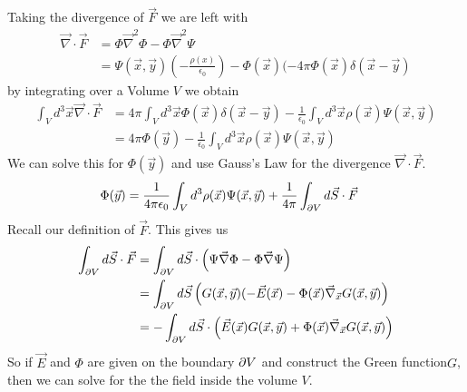 Taking the divergence of $\vec{F}$ we are left with
\begin{align*}
  \vec{\nabla}\cdot \vec{F} &= \Phi \vec{\nabla}^{2} \Phi - \Phi \vec{\nabla}^{2}\Psi\\
                            &= \Psi(\vec{x},\vec{y}) \left(
                              - \frac{\rho(x)}{\epsilon_0}
                            \right)
                            -
                            \Phi(\vec{x}) (- 4 \pi \Phi(\vec{x}) \delta(\vec{x} - \vec{y})
\end{align*}
by integrating over a Volume $V$ we obtain
\begin{align*}
  \int_V d^{3} \vec{x} \vec{\nabla} \cdot \vec{F} 
  &= 
  4 \pi \int_V d^{3} \vec{x} \Phi(\vec{x}) \delta(\vec{x} - \vec{y})
  - \frac{1}{\epsilon_0} \int_V d^{3} \vec{x} \rho(\vec{x}) \Psi(\vec{x},\vec{y})\\
  &=
  4 \pi \Phi(\vec{y})
  -
  \frac{1}{\epsilon_0} \int_V d^{3}\vec{x} \rho(\vec{x}) \Psi(\vec{x},\vec{y})
\end{align*}
We can solve this for $\Phi(\vec{y})$ and use Gauss's Law for the divergence $\vec{\nabla} \cdot \vec{F}$.
\begin{align*}
  \Phi(\vec{y}) &= \frac{1}{4 \pi \epsilon_0} \int_V d^{3} \rho(\vec{x}) \Psi(\vec{x},\vec{y}) + \frac{1}{4 \pi} \int_{\partial V} d \vec{S} \cdot \vec{F}
\end{align*}
Recall our definition of $\vec{F}$. This gives us
\begin{align*}
  \int_{\partial V} d \vec{S} \cdot \vec{F} 
  &=
  \int_{\partial V}d \vec{S} \cdot\left(
    \Psi \vec{\nabla} \Phi - \Phi \vec{\nabla}\Psi
  \right)\\
  &= \int_{\partial V}d \vec{S} \left(
    G(\vec{x}, \vec{y}) (- \vec{E}(\vec{x})
    -
    \Phi(\vec{x}) \vec{\nabla}_{\vec{x}}G(\vec{x},\vec{y})
  \right)\\
  &=
  - \int_{\partial V} d \vec{S} \cdot \left(
    \vec{E}(\vec{x})G(\vec{x}, \vec{y}) + \Phi(\vec{x}) \vec{\nabla}_{\vec{x}} G(\vec{x},\vec{y})
  \right)
\end{align*}
So if $\vec{E}$ and $\Phi$ are given on the boundary $\partial V$ and construct the Green function$G$, then we can solve for the the field inside the volume $V$.

